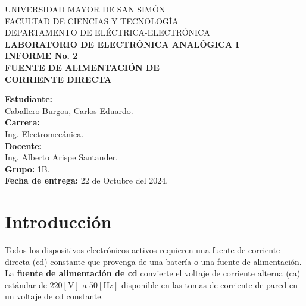 \documentclass[letter,twoside,11pt]{article}
\newcommand{\blankpage}{
\newpage
\thispagestyle{empty}
\mbox{}
\newpage
}
\begin{document}
\begin{titlepage}
    \begin{center}
        {\Large UNIVERSIDAD MAYOR DE SAN SIMÓN}\\
        \vspace*{0.15cm}
        {\large FACULTAD DE CIENCIAS Y TECNOLOGÍA}\\
        \vspace*{0.10cm}
        DEPARTAMENTO DE ELÉCTRICA-ELECTRÓNICA\\
        \vspace*{3.0cm}
        {\Large \textbf{LABORATORIO DE ELECTRÓNICA ANALÓGICA I}}\\
        \vspace*{0.3cm}
        {\Large \textbf{INFORME No. 2}}\\
        \vspace*{3.5cm}
        {\Large \textbf{FUENTE DE ALIMENTACIÓN DE \\
        CORRIENTE DIRECTA}}\\
    \end{center}

    \vspace*{5.8cm}
    \leftskip=7.95cm
    \noindent
    \textbf{Estudiante:}\\
    Caballero Burgoa, Carlos Eduardo.\\
    \newline
    \textbf{Carrera:}\\
    Ing. Electromecánica.\\
    \newline
    \textbf{Docente:}\\
    Ing. Alberto Arispe Santander.\\
    \newline
    \textbf{Grupo:} 1B.\\
    \textbf{Fecha de entrega:} 22 de Octubre del 2024.\\
\end{titlepage}
\addtocounter{page}{-1}

\blankpage
\addtocounter{page}{-1}

\section{Introducción}
Todos los dispositivos electrónicos activos requieren una fuente de corriente
directa (cd) constante que provenga de una batería o una fuente de
alimentación. La \textbf{fuente de alimentación de cd} convierte el voltaje de
corriente alterna (ca) estándar de $220[\text{V}]$ a $50[\text{Hz}]$ disponible
en las tomas de corriente de pared en un voltaje de cd constante.
\end{document}
